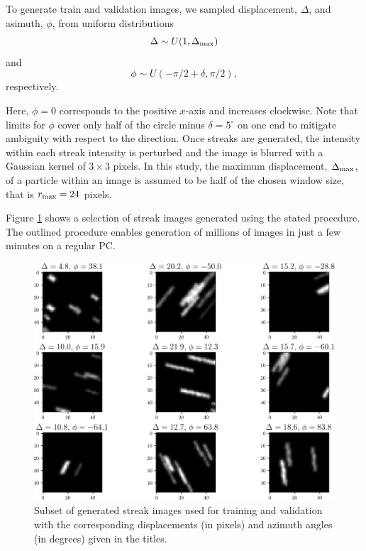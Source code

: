 \documentclass{svjour3}                     %
\begin{document}
To generate train and validation images, we sampled displacement, $\Delta$, and asimuth, $\phi$, from uniform distributions
\begin{equation}
\Delta \sim U(1, \Delta_\textnormal{max}) 
\end{equation}
and
\begin{equation}
\phi \sim U(-\pi/2+\delta, \pi/2),
\end{equation}
respectively. 

Here, $\phi = 0$ corresponds to the positive $x$-axis and increases clockwise. 
Note that limits for $\phi$ cover only half of the circle minus $\delta = 5^{\circ}$ on one end to mitigate ambiguity with respect to the direction. Once streaks are generated, the intensity within each streak intensity is perturbed and the image is blurred with a Gaussian kernel of $3\times 3$ pixels. In this study, the maximum displacement, $\Delta_\textnormal{max}$, of a particle within an image is assumed to be half of the chosen window size, that is $r_\textnormal{max} = 24$ pixels. 

Figure \ref{fig:fig1} shows a selection of streak images generated using the stated procedure. The outlined procedure enables generation of millions of images in just a few minutes on a regular PC. 

\begin{figure}
\includegraphics[width=\textwidth]{figs/figure1.png}
\caption{Subset of generated streak images used for training and validation with the corresponding displacements (in pixels) and azimuth angles (in degrees) given in the titles.}
\label{fig:fig1}
\end{figure}
\end{document}
